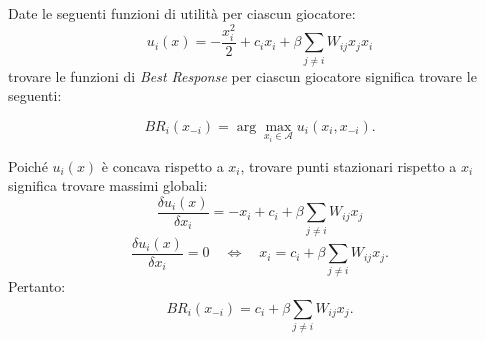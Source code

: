 \begin{alphaparts}
   \questionpart
   Date le seguenti funzioni di utilità per ciascun giocatore:
   \[
    u_i(x)=- \frac{x_i^2}{2}+ c_i x_i + \beta \sum\limits_{j \neq i} W_{ij}x_j x_i 
    \]
    trovare le funzioni di \textit{Best Response} per ciascun giocatore significa trovare le seguenti:

    \[BR_i(x_{ - i}) = \arg\max_{x_i \in \mathcal{A}} u_i(x_i, x_{ - i}).\]

    Poiché \(u_i(x)\) è concava rispetto a \(x_i\), trovare punti stazionari rispetto a \(x_i\) significa trovare massimi globali:
    \[
        \frac{\delta u_i ( x )}{\delta x_i} = -x_i + c_i + \beta  \sum \limits_{j \neq i}^{} W_{ij} x_j
    \]
    \[
        \frac{\delta u_i ( x )}{\delta x_i} = 0 \quad \iff \quad x_i = c_i + \beta  \sum \limits_{j \neq i}^{} W_{ij} x_j
    .\]
    Pertanto:
    \[
        BR_i(x_{-i}) = c_i + \beta  \sum \limits_{j \neq i}^{} W_{ij}x_j 
    .\]

    
\end{alphaparts}